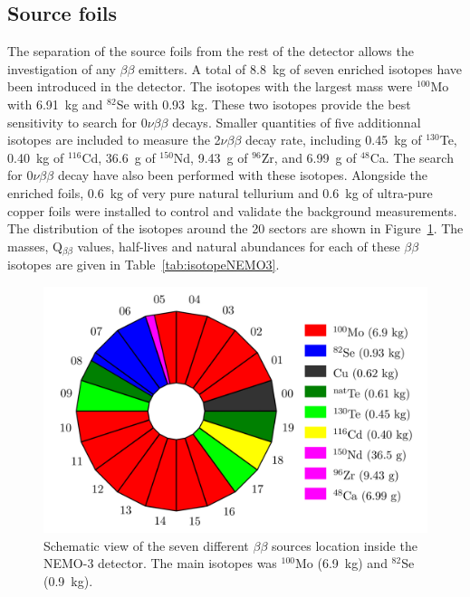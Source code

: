 \documentclass[main.tex]{subfiles}
\begin{document}
\FloatBarrier


\subsection{Source foils}


\NI The separation of the source foils from the rest of the detector allows the investigation of any $\beta\beta$ emitters. A total of 8.8~kg of seven enriched isotopes have been introduced in the detector. The isotopes with the largest mass were $^{\text{100}}$Mo with 6.91~kg and $^{\text{82}}$Se with 0.93~kg. These two isotopes provide the best sensitivity to search for 0$\nu\beta\beta$ decays. Smaller quantities of five additionnal isotopes are included to measure the 2$\nu\beta\beta$ decay rate, including 0.45~kg of $^{\text{130}}$Te, 0.40~kg of $^{\text{116}}$Cd, 36.6~g of $^{\text{150}}$Nd, 9.43~g of $^{\text{96}}$Zr, and 6.99~g of $^{\text{48}}$Ca. The search for 0$\nu\beta\beta$ decay have also been performed with these isotopes. Alongside the enriched foils, 0.6~kg of very pure natural tellurium and 0.6~kg of ultra-pure copper foils were installed to control and validate the background measurements. The distribution of the isotopes around the 20 sectors are shown in Figure~\ref{NEMO3Sector}. The masses, Q$_{\beta\beta}$ values, half-lives and natural abundances for each of these $\beta\beta$ isotopes are given in Table~\ref{tab:isotopeNEMO3}.



\begin{figure}[h!]
\begin{center}
\includegraphics[scale=0.45]{pictures/Chap3/BBSourceDistribution.png}
\caption{Schematic view of the seven different $\beta\beta$ sources location inside the NEMO-3 detector. The main isotopes was $^{\text{100}}$Mo (6.9~kg) and $^{\text{82}}$Se (0.9~kg).}
\label{NEMO3Sector}
\end{center}
\end{figure}
\end{document}
